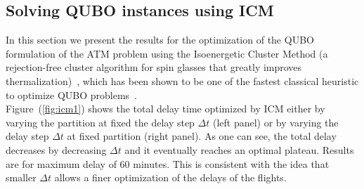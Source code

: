 \subsection{Solving QUBO instances using ICM}

In this section we present the results for the optimization of the QUBO
formulation of the ATM problem using the Isoenergetic Cluster Method (a
rejection-free cluster algorithm for spin glasses that greatly improves
thermalization)~\cite{zhu2015}, which has been shown to be one of the fastest
classical heuristic to optimize QUBO problems~\cite{mandra2016}.\\

Figure~(\ref{fig:icm1}) shows the total delay time optimized by ICM either by 
varying the partition at fixed the delay step $\Delta t$ (left panel) or by
varying the delay step $\Delta t$ at fixed partition (right panel). As one can
see, the total delay decreases by decreasing $\Delta t$ and it eventually
reaches an optimal plateau. Results are for maximum delay of 60 minutes. This is
consistent with the idea that smaller $\Delta t$ allows a finer optimization of
the delays of the flights.\\

